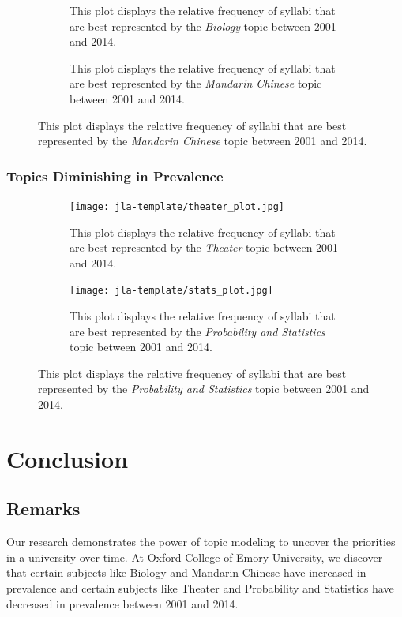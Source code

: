 \documentclass[fleqn,10pt]{JLA_article} %
\begin{document}
\begin{figure}[H]
\centering
    \begin{subfigure}
    \texttt{[image: jla-template/biology\_plot.jpg]}
   \caption{This plot displays the relative frequency of syllabi that are best represented by the \textit{Biology} topic between 2001 and 2014.}
    \end{subfigure}
    \begin{subfigure}
    \texttt{[image: jla-template/chinese\_plot.jpg]}
   \caption{This plot displays the relative frequency of syllabi that are best represented by the \textit{Mandarin Chinese} topic between 2001 and 2014.}
    \end{subfigure}
\end{figure}




\subsubsection{Topics Diminishing in Prevalence}

\begin{figure}[H]

    \begin{subfigure}
    \centering
    \texttt{[image: jla-template/theater\_plot.jpg]}
    \caption{This plot displays the relative frequency of syllabi that are best represented by the \textit{Theater} topic between 2001 and 2014.}
    \label{fig:my_label}
    \end{subfigure}
    \begin{subfigure}
    \centering
    \texttt{[image: jla-template/stats\_plot.jpg]}
    \caption{This plot displays the relative frequency of syllabi that are best represented by the \textit{Probability and Statistics} topic between 2001 and 2014.}
    \label{fig:my_label}
    \end{subfigure}
\end{figure}

\section{Conclusion}

\subsection{Remarks}

Our research demonstrates the power of topic modeling to uncover the priorities in a university over time. At Oxford College of Emory University, we discover that certain subjects like Biology and Mandarin Chinese have increased in prevalence and certain subjects like Theater and Probability and Statistics have decreased in prevalence between 2001 and 2014.
\end{document}
